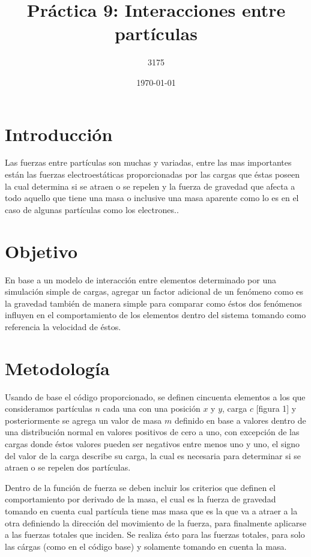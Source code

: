 \documentclass{article}
\author{3175}
\title{Práctica 9: Interacciones entre partículas}
\date{\today}
\begin{document}
\maketitle


\section{Introducción}

Las fuerzas entre partículas son muchas y variadas, entre las mas importantes están las fuerzas electroestáticas proporcionadas por las cargas que éstas poseen la cual determina si se atraen o se repelen y la fuerza de gravedad que afecta a todo aquello que tiene una masa o inclusive una masa aparente como lo es en el caso de algunas partículas como los electrones.\citep{web1}.
 
\section{Objetivo}
En base a un modelo de interacción entre elementos determinado por una simulación simple de cargas, agregar un factor adicional de un fenómeno como es la gravedad también de manera simple para comparar como éstos dos fenómenos influyen en el comportamiento de los elementos dentro del sistema tomando como referencia la velocidad de éstos.

\section{Metodología}

Usando de base el código proporcionado\citep{webelisa}, se definen cincuenta elementos a los que consideramos partículas $n$ cada una con una posición $x$ y $y$, carga $c$ [figura 1] y posteriormente se agrega un valor de masa $m$ definido en base a valores dentro de una distribución normal en valores positivos de cero a uno, con excepción de las cargas donde éstos valores pueden ser negativos entre menos uno y uno, el signo del valor de la carga describe su carga, la cual es necesaria para determinar si se atraen o se repelen dos partículas.

Dentro de la función de fuerza se deben incluir los criterios que definen el comportamiento por derivado de la masa, el cual es la fuerza de gravedad tomando en cuenta cual partícula tiene mas masa que es la que va a atraer a la otra definiendo la dirección del movimiento de la fuerza, para finalmente aplicarse a las fuerzas totales que inciden. Se realiza ésto para las fuerzas totales, para solo las cárgas (como en el código base) y solamente tomando en cuenta la masa.
\end{document}
